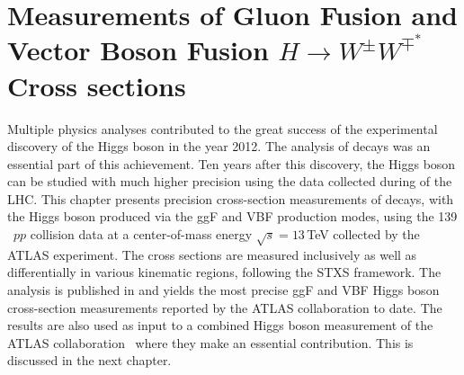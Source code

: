 \chapter[$H\rightarrow W^{\pm}W^{\mp^*}$ Cross-Section Measurements]{Measurements of Gluon Fusion and Vector Boson Fusion $H\rightarrow W^{\pm}W^{\mp^*}$ Cross sections}
\label{chap:hww}
Multiple physics analyses contributed to the great success of the experimental discovery of the Higgs boson in the year 2012. The analysis of \HWW decays was an essential part of this achievement. 
Ten years after this discovery, the Higgs boson can be studied with much higher precision using the data collected during \RunTwo of the LHC. 
This chapter presents precision cross-section measurements of \HWW decays, with the Higgs boson produced via the ggF and VBF production modes, using the 139\,\ifb\ $pp$ collision data at a center-of-mass energy $\sqrt{s} = 13\,$TeV collected by the ATLAS experiment.
The cross sections are measured inclusively as well as differentially in various kinematic regions, following the STXS framework.
The analysis is published in  and yields the most precise ggF and VBF Higgs boson cross-section measurements reported by the ATLAS collaboration to date.
The results are also used as input to a combined Higgs boson measurement of the ATLAS collaboration~\cite{NaturePaper} where they make an essential contribution. This is discussed in the next chapter. 

